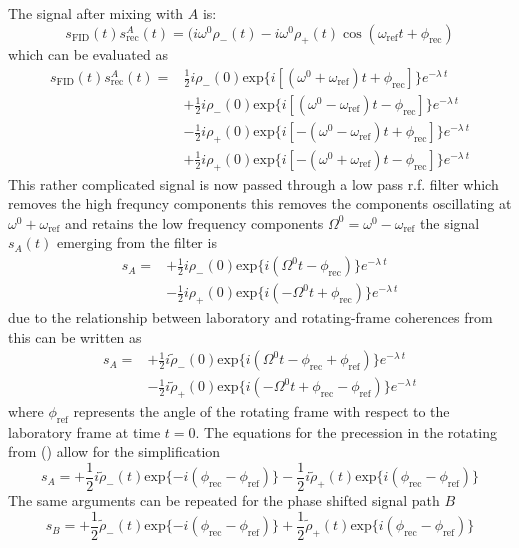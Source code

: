 The signal after mixing with $A$ is:
\begin{equation}
  s_\text{FID}(t)s_\text{rec}^A(t) = (i\omega^0\rho_-(t) - i\omega^0\rho_+(t)\cos(\omega_\text{ref}t + \phi_\text{rec})
\end{equation}
which can be evaluated as
\begin{align}
  s_{\text{FID}}(t)s_{\text{rec}}^A(t) =& \frac{1}{2}i\rho_-(0)\text{exp}\{i[(\omega^0 + \omega_{\text{ref}})t + \phi_{\text{rec}}]\}e^{-\lambda~t}\\
                                        &+\frac{1}{2}i\rho_-(0)\text{exp}\{i[(\omega^0 - \omega_{\text{ref}})t - \phi_{\text{rec}}]\}e^{-\lambda~t}\\
                                        &-\frac{1}{2}i\rho_+(0)\text{exp}\{i[-(\omega^0 - \omega_{\text{ref}})t + \phi_{\text{rec}}]\}e^{-\lambda~t}\\
                                        &+\frac{1}{2}i\rho_+(0)\text{exp}\{i[-(\omega^0 + \omega_{\text{ref}})t - \phi_{\text{rec}}]\}e^{-\lambda~t}
\end{align}
This rather complicated signal is now passed through a low pass r.f. filter which removes the high frequncy components this
removes the components oscillating at $\omega^0 + \omega_{\text{ref}}$ and retains the low frequency components
$\Omega^0 = \omega^0 - \omega_{\text{ref}}$ the signal $s_A(t)$ emerging from the filter is
\begin{align}
  s_A =& +\frac{1}{2}i\rho_-(0)\text{exp}\{i(\Omega^0t - \phi_{\text{rec}})\}e^{-\lambda~t}\\
       & -\frac{1}{2}i\rho_+(0)\text{exp}\{i(-\Omega^0t+ \phi_{\text{rec}})\}e^{-\lambda~t}
\end{align}
due to the relationship between laboratory and rotating-frame coherences from 
this can be written as
\begin{align}
  s_A =& +\frac{1}{2}i\tilde{\rho}_-(0)\text{exp}\{i(\Omega^0t - \phi_{\text{rec}} + \phi_{\text{ref}})\}e^{-\lambda~t}\\
       & -\frac{1}{2}i\tilde{\rho}_+(0)\text{exp}\{i(-\Omega^0t+ \phi_{\text{rec}} - \phi_{\text{ref}})\}e^{-\lambda~t}
\end{align}
where $\phi_{\text{ref}}$ represents the angle of the rotating frame with respect to the laboratory frame
at time $t = 0$. The equations for the precession in the rotating from ()
allow for the simplification
\begin{equation}
  s_A = +\frac{1}{2}i\tilde{\rho}_-(t)\text{exp}\{-i(\phi_{\text{rec}} - \phi_{\text{ref}})\}
        -\frac{1}{2}i\tilde{\rho}_+(t)\text{exp}\{i(\phi_{\text{rec}} - \phi_{\text{ref}})\}
\end{equation}
The same arguments can be repeated for the phase shifted signal path $B$
\begin{equation}
  s_B = +\frac{1}{2}\tilde{\rho}_-(t)\text{exp}\{-i(\phi_{\text{rec}} - \phi_{\text{ref}})\}
        +\frac{1}{2}\tilde{\rho}_+(t)\text{exp}\{i(\phi_{\text{rec}} - \phi_{\text{ref}})\}
\end{equation}

